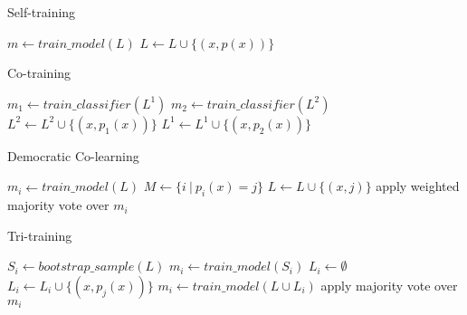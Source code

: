 \documentclass{article}
\begin{document}
\begin{algorithm}\centering
\caption{Self-training}
\begin{algorithmic}[1]
\Repeat
	\State $m \gets train\_model(L)$
        	\State $L \gets L \cup \{(x, p(x))\}$
    	\EndIf
    \EndFor
{}
\end{algorithmic}
\end{algorithm}

\begin{algorithm}
\caption{Co-training }
\begin{algorithmic}[1]
\Repeat
	\State $m_1 \gets train\_classifier(L^1)$
    \State $m_2 \gets train\_classifier(L^2)$
           	\State $L^2 \gets L^2 \cup \{(x, p_1(x))\}$
     \EndIf
           	\State $L^1 \gets L^1 \cup \{(x, p_2(x))\}$
     \EndIf
    \EndFor
{}
\end{algorithmic}
\end{algorithm}

\begin{algorithm}
\caption{Democratic Co-learning}
\begin{algorithmic}[1]
\Repeat
		\State $m_i \gets train\_model(L)$
	\EndFor
			\State $M \gets \{i \: | \: p_i(x) = j \}$
           		\State $L \gets L \cup \{(x, j)\}$
    			\EndIf
        \EndFor
	\EndFor
{}
\State apply weighted majority vote over $m_i$
\end{algorithmic}
\end{algorithm}

\begin{algorithm}
\caption{Tri-training } 
\begin{algorithmic}[1]
\State $S_i \gets bootstrap\_sample(L)$
\State $m_i \gets train\_model(S_i)$
\EndFor
\Repeat
        \State $L_i \gets \emptyset$
            	\State $L_i \gets L_i \cup \{(x, p_j(x))\}$
            \EndIf
        \EndFor
       \State $m_i \gets train\_model(L \cup L_i)$
	\EndFor
{}
\State apply majority vote over $m_i$
\end{algorithmic}
\end{algorithm}
\end{document}
